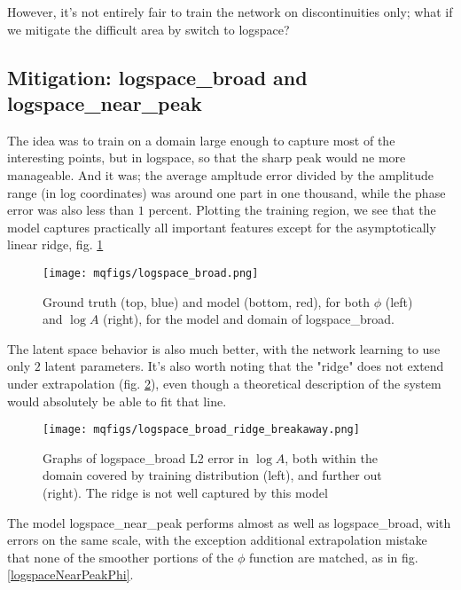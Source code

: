 \documentclass[aps,prl,preprint,groupedaddress]{revtex4-1}
\begin{document}
However, it's not entirely fair to train the network on discontinuities only; what if we mitigate the difficult area by switch to logspace?

\subsection{ Mitigation: logspace\_broad and logspace\_near\_peak}

The idea was to train on a domain large enough to capture most of the interesting points, but in logspace, so that the sharp peak would ne more manageable. And it was; the average ampltude error divided by the amplitude range (in log coordinates) was around one part in one thousand, while the phase error was also less than $1$ percent. Plotting the training region, we see that the model captures practically all important features except for the asymptotically linear ridge, fig. \ref{4panelLogBroad}

\begin{figure}[h]
   \centering
   \texttt{[image: mqfigs/logspace\_broad.png]}
   \caption{\label{4panelLogBroad} Ground truth (top, blue) and model (bottom, red), for both $\phi$ (left) and $\log A$ (right), for the model and domain of logspace\_broad.}
\end{figure}

The latent space behavior is also much better, with the network learning to use only $2$ latent parameters. It's also worth noting that the "ridge" does not extend under extrapolation (fig. \ref{badridge}), even though a theoretical description of the system would absolutely be able to fit that line.

\begin{figure}[h]
   \centering
   \texttt{[image: mqfigs/logspace\_broad\_ridge\_breakaway.png]}
   \caption{\label{badridge} Graphs of logspace\_broad L2 error in $\log A$, both within the domain covered by training distribution (left), and further out (right). The ridge is not well captured by this model}
\end{figure}

The model logspace\_near\_peak performs almost as well as logspace\_broad, with errors on the same scale, with the exception additional extrapolation mistake that none of the smoother portions of the $\phi$ function are matched, as in fig. \ref{logspaceNearPeakPhi}.
\end{document}
